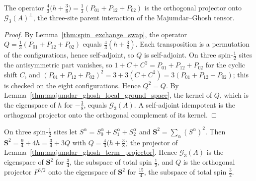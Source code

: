 \begin{lemma}%
    \label{thm:majumdar_ghosh_term_projector}
    \leanok
    The operator
    $\tfrac43\bigl(h+\tfrac38\bigr)=\tfrac13(P_{01}+P_{12}+P_{02})$ is the
    orthogonal projector onto $\mathcal G_{3}(A)^{\perp}$, the three-site parent
    interaction of the Majumdar--Ghosh tensor.
\end{lemma}

\begin{proof}
    \leanok
    By Lemma~\ref{thm:spin_exchange_swap}, the operator
    $Q=\tfrac13(P_{01}+P_{12}+P_{02})$ equals $\tfrac43(h+\tfrac38)$. Each
    transposition is a permutation of the configurations, hence self-adjoint,
    so $Q$ is self-adjoint. On three spin-$\tfrac12$ sites the antisymmetric part
    vanishes, so $1+C+C^{2}=P_{01}+P_{12}+P_{02}$ for the cyclic shift $C$, and
    $(P_{01}+P_{12}+P_{02})^{2}=3+3(C+C^{2})=3(P_{01}+P_{12}+P_{02})$; this is
    checked on the eight configurations. Hence $Q^{2}=Q$. By
    Lemma~\ref{thm:majumdar_ghosh_local_ground_space}, the kernel of $Q$,
    which is the eigenspace of $h$ for $-\tfrac38$, equals $\mathcal G_{3}(A)$.
    A self-adjoint idempotent is the orthogonal projector onto the orthogonal
    complement of its kernel.
\end{proof}

\begin{lemma}%
    \label{thm:majumdar_ghosh_term_total_spin}
    \leanok
    On three spin-$\tfrac12$ sites let $S^\alpha=S^\alpha_0+S^\alpha_1+S^\alpha_2$
    and $\mathbf S^{2}=\sum_\alpha(S^\alpha)^{2}$. Then
    $\mathbf S^{2}=\tfrac94+4h=\tfrac34+3Q$ with
    $Q=\tfrac43\bigl(h+\tfrac38\bigr)$ the projector of
    Lemma~\ref{thm:majumdar_ghosh_term_projector}. Hence $\mathcal G_{3}(A)$ is
    the eigenspace of $\mathbf S^{2}$ for $\tfrac34$, the subspace of total spin
    $\tfrac12$, and $Q$ is the orthogonal projector $P^{3/2}$ onto the eigenspace of
    $\mathbf S^{2}$ for $\tfrac{15}4$, the subspace of total spin $\tfrac32$.
\end{lemma}

